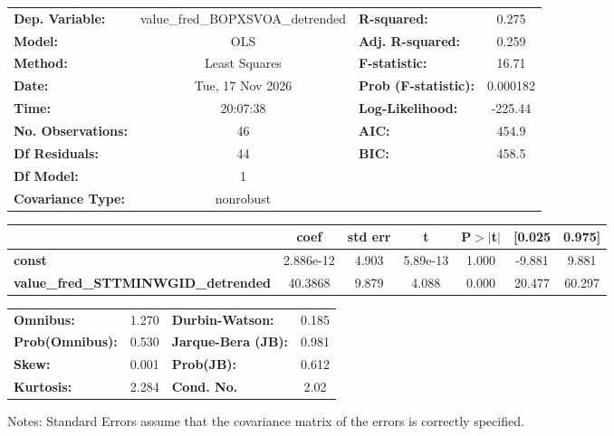 \begin{center}
\begin{tabular}{lclc}
\toprule
\textbf{Dep. Variable:}                     & value\_fred\_BOPXSVOA\_detrended & \textbf{  R-squared:         } &     0.275   \\
\textbf{Model:}                             &               OLS                & \textbf{  Adj. R-squared:    } &     0.259   \\
\textbf{Method:}                            &          Least Squares           & \textbf{  F-statistic:       } &     16.71   \\
\textbf{Date:}                              &         Tue, 17 Nov 2026         & \textbf{  Prob (F-statistic):} &  0.000182   \\
\textbf{Time:}                              &             20:07:38             & \textbf{  Log-Likelihood:    } &   -225.44   \\
\textbf{No. Observations:}                  &                  46              & \textbf{  AIC:               } &     454.9   \\
\textbf{Df Residuals:}                      &                  44              & \textbf{  BIC:               } &     458.5   \\
\textbf{Df Model:}                          &                   1              & \textbf{                     } &             \\
\textbf{Covariance Type:}                   &            nonrobust             & \textbf{                     } &             \\
\bottomrule
\end{tabular}
\begin{tabular}{lcccccc}
                                            & \textbf{coef} & \textbf{std err} & \textbf{t} & \textbf{P$> |$t$|$} & \textbf{[0.025} & \textbf{0.975]}  \\
\midrule
\textbf{const}                              &    2.886e-12  &        4.903     &  5.89e-13  &         1.000        &       -9.881    &        9.881     \\
\textbf{value\_fred\_STTMINWGID\_detrended} &      40.3868  &        9.879     &     4.088  &         0.000        &       20.477    &       60.297     \\
\bottomrule
\end{tabular}
\begin{tabular}{lclc}
\textbf{Omnibus:}       &  1.270 & \textbf{  Durbin-Watson:     } &    0.185  \\
\textbf{Prob(Omnibus):} &  0.530 & \textbf{  Jarque-Bera (JB):  } &    0.981  \\
\textbf{Skew:}          &  0.001 & \textbf{  Prob(JB):          } &    0.612  \\
\textbf{Kurtosis:}      &  2.284 & \textbf{  Cond. No.          } &     2.02  \\
\bottomrule
\end{tabular}
\end{center}

Notes: \newline
 [1] Standard Errors assume that the covariance matrix of the errors is correctly specified.